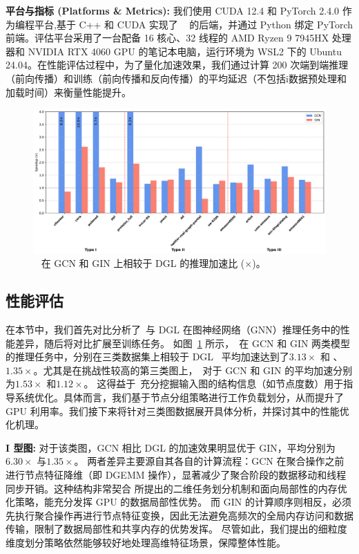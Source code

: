 \textbf{平台与指标 (Platforms \& Metrics): }
\label{sect: Platforms and Metrics }
我们使用 CUDA 12.4 和 PyTorch 2.4.0 作为编程平台,基于 C++ 和 CUDA 实现了 ~\Mname{} 的后端，并通过 Python 绑定 PyTorch 前端。评估平台采用了一台配备 16 核心、32 线程的 AMD Ryzen 9 7945HX 处理器和 NVIDIA RTX 4060 GPU 的笔记本电脑，运行环境为 WSL2 下的 Ubuntu 24.04。在性能评估过程中，为了量化加速效果，我们通过计算 200 次端到端推理（前向传播）和训练（前向传播和反向传播）的平均延迟（不包括i数据预处理和加载时间）来衡量性能提升。
\begin{figure}[htbp] 
    \centering
    \includegraphics[width=0.9\linewidth]{images/dgl_infer_cmp.pdf} 
    \caption{~\Mname{} 在 GCN 和 GIN 上相较于 DGL 的推理加速比 ($\times$)。}
    \label{fig: Speedup vs DGL inference}
    \setlength{\abovecaptionskip}{0.4cm} %
    \setlength{\belowcaptionskip}{-0.4cm} %
\end{figure}
\subsection{性能评估}
在本节中，我们首先对比分析了~\Mname{}与 DGL 在图神经网络（GNN）推理任务中的性能差异，随后将对比扩展至训练任务。
如图~\ref{fig: Speedup vs DGL inference} 所示，~\Mname{}在 GCN 和 GIN 两类模型的推理任务中，分别在三类数据集上相较于 DGL~\cite{wang2019dgl} 平均加速达到了$3.13\times$ 和 、$1.35\times$。尤其是在挑战性较高的第三类图上，~\Mname{}对于 GCN 和 GIN 的平均加速分别为$1.53\times$ 和$1.12\times$。 这得益于~\Mname{}充分挖掘输入图的结构信息（如节点度数）用于指导系统优化。具体而言，我们基于节点分组策略进行工作负载划分，从而提升了 GPU 利用率。我们接下来将针对三类图数据展开具体分析，并探讨其中的性能优化机理。

\textbf{I 型图:}
对于该类图，GCN 相比 DGL 的加速效果明显优于 GIN，平均分别为$6.30\times$ 与$1.35\times$。
两者差异主要源自其各自的计算流程：GCN 在聚合操作之前进行节点特征降维（即 DGEMM 操作），显著减少了聚合阶段的数据移动和线程同步开销。这种结构非常契合 \Mname 所提出的二维任务划分机制和面向局部性的内存优化策略，能充分发挥 GPU 的数据局部性优势。
而 GIN 的计算顺序则相反，必须先执行聚合操作再进行节点特征变换，因此无法避免高频次的全局内存访问和数据传输，限制了数据局部性和共享内存的优势发挥。
尽管如此，我们提出的细粒度维度划分策略依然能够较好地处理高维特征场景，保障整体性能。

